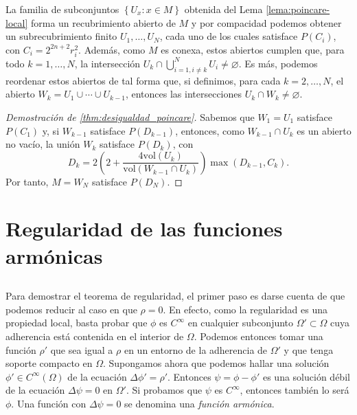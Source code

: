 \documentclass[11pt,a4paper]{amsbook}
\theoremstyle{remark} \newtheorem{rmk}[subsection]{Observación}
\theoremstyle{definition} \newtheorem{defn}[subsection]{Definición}
\theoremstyle{definition} \newtheorem{ex}[subsection]{Ejemplo}
\theoremstyle{definition} \newtheorem{ej}[subsection]{Ejercicio}
\begin{document}
La familia de subconjuntos $\left\{ U_x:x\in M  \right\}$ obtenida del Lema \ref{lema:poincare-local} forma un recubrimiento abierto de $M$ y por compacidad podemos obtener un subrecubrimiento finito $U_1,\dots,U_N$, cada uno de los cuales satisface $P(C_i)$, con $C_i=2^{2n+2} r_i^2$. Además, como $M$ es conexa, estos abiertos cumplen que, para todo $k=1,\dots,N$, la intersección $U_k \cap \bigcup_{i=1, i\neq k}^N U_i \neq \varnothing$. Es más, podemos reordenar estos abiertos de tal forma que, si definimos, para cada $k=2,\dots,N$, el abierto $W_k=U_1\cup \cdots \cup U_{k-1}$, entonces las intersecciones $U_k \cap W_k \neq \varnothing$.

\begin{proof}[Demostración de \ref{thm:desigualdad_poincare}]
Sabemos que $W_1=U_1$ satisface $P(C_1)$ y, si $W_{k-1}$ satisface $P(D_{k-1})$, entonces, como $W_{k-1}\cap U_k$ es un abierto no vacío, la unión $W_k$ satisface $P(D_k)$, con
\begin{equation*}
D_k = 2 \left( 2+ \frac{4\mathrm{vol}(U_k)}{\mathrm{vol}(W_{k-1}\cap U_k)} \right) \max(D_{k-1},C_k).
\end{equation*}
Por tanto, $M=W_N$ satisface $P(D_N)$.
\end{proof}


\section{Regularidad de las funciones armónicas}
\subsection{} Para demostrar el teorema de regularidad, el primer paso es darse cuenta de que podemos reducir al caso en que $\rho=0$. En efecto, como la regularidad es una propiedad local, basta probar que $\phi$ es $C^\infty$ en cualquier subconjunto $\Omega'\subset \Omega$ cuya adherencia está contenida en el interior de $\Omega$. Podemos entonces tomar una función $\rho'$ que sea igual a $\rho$ en un entorno de la adherencia de $\Omega'$ y que tenga soporte compacto en $\Omega$. Supongamos ahora que podemos hallar una solución $\phi'\in C^\infty(\Omega)$ de la ecuación $\Delta \phi'=\rho'$. Entonces $\psi=\phi-\phi'$ es una solución débil de la ecuación $\Delta \psi=0$ en $\Omega'$. Si probamos que $\psi$ es $C^\infty$, entonces también lo será $\phi$. Una función con $\Delta \psi = 0$ se denomina una \emph{función armónica}.
\end{document}
